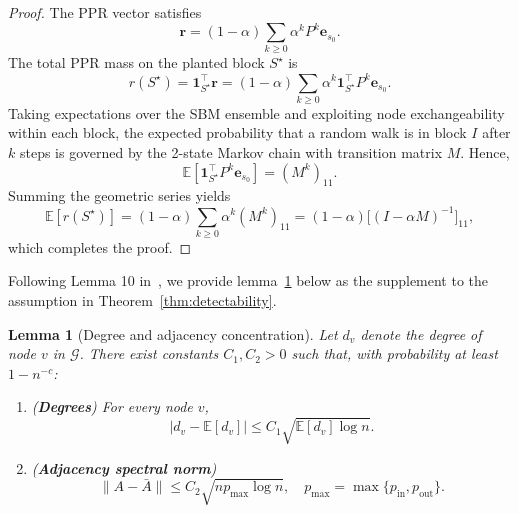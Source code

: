 \documentclass[11pt,english]{article}
\newtheorem{lemma}{Lemma}
\begin{document}
\begin{proof}
The PPR vector satisfies
\[
\mathbf{r} = (1-\alpha)\sum_{k\ge0}\alpha^k P^k \mathbf{e}_{s_0}.
\]
The total PPR mass on the planted block $S^\star$ is
\[
r(S^\star) = \mathbf{1}_{S^\star}^\top \mathbf{r}
= (1-\alpha)\sum_{k\ge0}\alpha^k 
\mathbf{1}_{S^\star}^\top P^k \mathbf{e}_{s_0}.
\]
Taking expectations over the SBM ensemble and exploiting node exchangeability within each block,
the expected probability that a random walk is in block $I$ after $k$ steps is governed by the 2-state Markov chain with transition matrix $M$. Hence,
\[
\mathbb{E}\!\left[\mathbf{1}_{S^\star}^\top P^k \mathbf{e}_{s_0}\right]
= (M^k)_{11}.
\]
Summing the geometric series yields
\[
\mathbb{E}[r(S^\star)] = (1-\alpha)\sum_{k\ge0}\alpha^k (M^k)_{11}
= (1-\alpha)\big[(I-\alpha M)^{-1}\big]_{11},
\]
which completes the proof.
\end{proof}



Following Lemma 10 in~\parencite{avrachenkov2015pagerank}, we provide lemma~\ref{lem:concentration} below as the supplement to the assumption in Theorem~\ref{thm:detectability}.
\begin{lemma}[Degree and adjacency concentration]
\label{lem:concentration}
Let $d_v$ denote the degree of node $v$ in $\mathcal{G}$. There exist constants $C_1,C_2>0$ such that, with probability at least $1-n^{-c}$:
\begin{enumerate}
\item[(i)] (\textbf{Degrees}) For every node $v$,
\[
    |d_v-\mathbb{E}[d_v]| \le C_1\sqrt{\mathbb{E}[d_v]\log n}.
\]
\item[(ii)] (\textbf{Adjacency spectral norm})
\[
    \|A-\bar A\| \le C_2\sqrt{n p_{\max}\log n}, \quad p_{\max} = \max\{p_{\mathrm{in}},p_{\mathrm{out}}\}.
\]
\end{enumerate}
\end{lemma}
\end{document}
